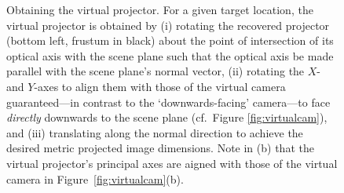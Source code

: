 \documentclass[review]{elsarticle}
\begin{document}
\begin{figure}[t]
    \centering
    \qquad
    \caption{Obtaining the virtual projector. For a given target location, the virtual projector is obtained by (i) rotating the recovered projector (bottom left, frustum in black) about the point of intersection of its optical axis with the scene plane such that the optical axis be made parallel with the scene plane's normal vector, (ii) rotating the $X$- and $Y$-axes to align them with those of the virtual camera guaranteed---in contrast to the `downwards-facing' camera---to face \textit{directly} downwards to the scene plane (cf.\ Figure \ref{fig:virtualcam}), and (iii) translating along the normal direction to achieve the desired metric projected image dimensions. Note in (b) that the virtual projector's principal axes are aigned with those of the virtual camera in Figure~\ref{fig:virtualcam}(b).} %
    \label{fig:virtualproj}
\end{figure}
\end{document}
